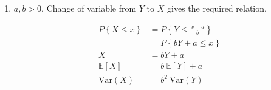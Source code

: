 \begin{enumerate}
	
	\item $ a, b > 0 $. Change of variable from $ Y $ to $ X $ gives the required relation.
	
		\begin{align}
			P \left\{X \leq x\right\} &= P \left\{ Y \leq \frac{x - a}{b}\right\} \nonumber \\
			&= P \left\{ bY + a \leq x\right\} \\
			X &= bY + a \nonumber \\
			\mathbb{E}[X] &= b\ \mathbb{E}[Y] + a \\
			\mathrm{Var}(X) &= b^2\ \mathrm{Var}(Y)
		\end{align}
	
	
	
\end{enumerate}